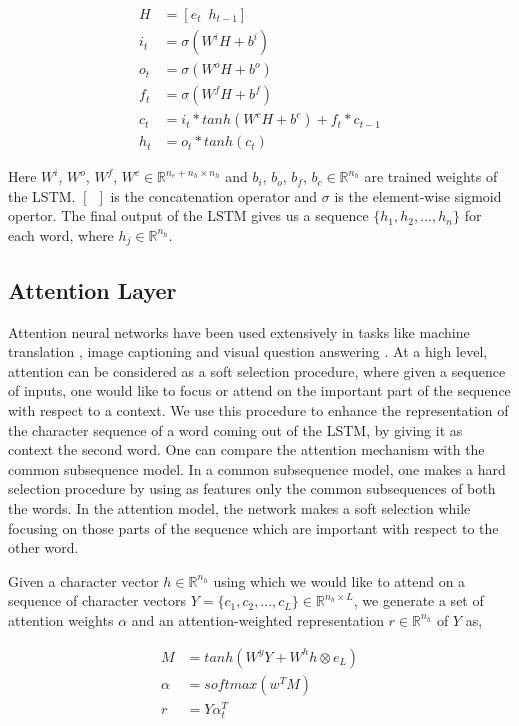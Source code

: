 \documentclass[11pt,letterpaper]{article}
\begin{document}
\begin{align}
H &= [e_t \enspace h_{t-1}] \\
i_t &= \sigma (W^iH + b^i) \\
o_t &= \sigma (W^oH + b^o) \\
f_t &= \sigma (W^fH + b^f) \\
c_t &= i_t * tanh(W^cH + b^c) + f_t * c_{t-1} \\
h_t &= o_t * tanh(c_t)
\end{align}

Here $W^i$, $W^o$, $W^f$, $W^c \in  \mathbb{R}^{n_e+n_h \times n_h}$ and $b_i$, $b_o$, $b_f$, $b_c \in \mathbb{R}^{n_h}$ are trained weights of the LSTM. $[\enspace]$ is the concatenation operator and $\sigma$ is the element-wise sigmoid opertor. The final output of the LSTM gives us a sequence $\{h_1, h_2, ..., h_n\}$ for each word, where $h_j \in \mathbb{R}^{n_h}$.

\subsection{Attention Layer}

Attention neural networks have been used extensively in tasks like machine translation \cite{mtattention}, image captioning \cite{cpattention} and visual question answering \cite{stackedattention}. At a high level, attention can be considered as a soft selection procedure, where given a sequence of inputs, one would like to focus or attend on the important part of the sequence with respect to a context. We use this procedure to enhance the representation of the character sequence of a word coming out of the LSTM, by giving it as context the second word. One can compare the attention mechanism with the common subsequence model. In a common subsequence model, one makes a hard selection procedure by using as features only the common subsequences of both the words. In the attention model, the network makes a soft selection while focusing on those parts of the sequence which are important with respect to the other word.

Given a character vector $h \in  \mathbb{R}^{n_h}$ using which we would like to attend on a sequence of character vectors $Y = \{c_1, c_2, ..., c_L\} \in \mathbb{R}^{n_h \times L}$, we generate a set of attention weights $\alpha$ and an attention-weighted representation $r \in  \mathbb{R}^{n_h}$ of $Y$ as,

\begin{align}
M &= tanh(W^yY + W^hh\otimes e_L) \\
\alpha &= softmax(w^TM) \\
r &= Y\alpha_t^T
\end{align}
\end{document}
